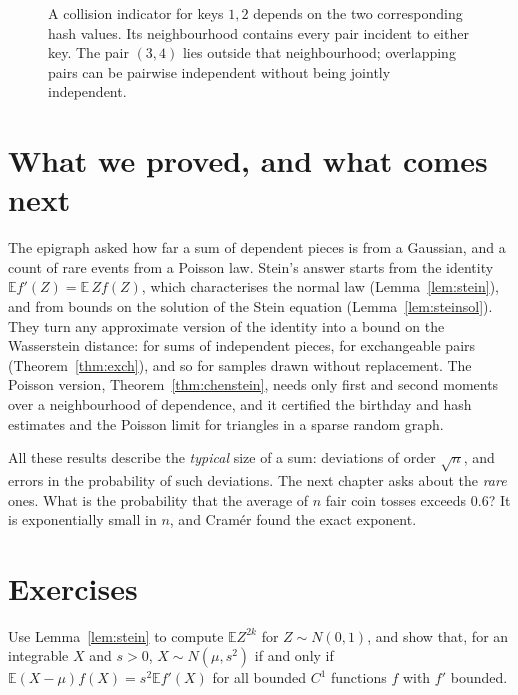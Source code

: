 \begin{figure}[ht]
\centering{}
\caption{A collision indicator for keys $1,2$ depends on the two corresponding hash values. Its neighbourhood contains every pair incident to either key. The pair $(3,4)$ lies outside that neighbourhood; overlapping pairs can be pairwise independent without being jointly independent.}
\label{fig:v11-ch06-dependence}
\end{figure}

\section{What we proved, and what comes next}

The epigraph asked how far a sum of dependent pieces is from a Gaussian, and a count of rare events from a Poisson law. Stein's answer starts from
the identity $\mathbb Ef'(Z)=\mathbb E\,Zf(Z)$, which characterises the normal law (Lemma~\ref{lem:stein}), and from bounds on the solution of the
Stein equation (Lemma~\ref{lem:steinsol}). They turn any approximate version of the identity into a bound on the Wasserstein distance: for sums of
independent pieces, for exchangeable pairs (Theorem~\ref{thm:exch}), and so for samples drawn without replacement. The Poisson version,
Theorem~\ref{thm:chenstein}, needs only first and second moments over a neighbourhood of dependence, and it certified the birthday and hash estimates
and the Poisson limit for triangles in a sparse random graph.

All these results describe the \emph{typical} size of a sum: deviations of order $\sqrt n$, and errors in the probability of such deviations. The next
chapter asks about the \emph{rare} ones. What is the probability that the average of $n$ fair coin tosses exceeds $0.6$? It is exponentially small in $n$,
and Cram\'er found the exact exponent.

\section{Exercises}

\begin{exercise}[$\star$]\label{ex:gaussmoments}
Use Lemma~\ref{lem:stein} to compute $\mathbb EZ^{2k}$ for $Z\sim N(0,1)$, and show that, for an integrable $X$ and $s>0$, $X\sim N(\mu,s^2)$ if and only if $\mathbb E(X-\mu)f(X)=s^2\mathbb Ef'(X)$ for all
bounded $C^1$ functions $f$ with $f'$ bounded.
\end{exercise}

